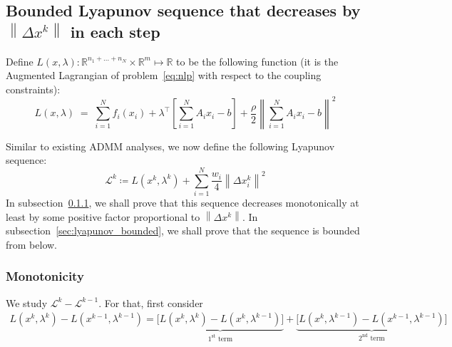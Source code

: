 \documentclass[11pt]{article}
\newcommand{\norm}[1]{\left\lVert #1 \right\rVert}
\begin{document}
\subsection{Bounded Lyapunov sequence that decreases by $\norm{\Delta x^k}$ in each step}\label{sec:proof:lyapunov}
Define $L(x, \lambda) : \mathbb{R}^{n_1 + \ldots + n_N} \times \mathbb{R}^m \mapsto \mathbb{R}$ to be the following function (it is the Augmented Lagrangian of problem~\eqref{eq:nlp} with respect to the coupling constraints):
\begin{equation}\label{eq:L_def}
L(x, \lambda)
\; = \;
\sum_{i = 1}^N f_i(x_i) + \lambda^\top \left[ \sum_{i = 1}^N A_ix_i - b\right] + \frac{\rho}{2} \norm{\sum_{i=1}^N A_ix_i - b}^2
\end{equation}

{\color{magenta} Similar to existing ADMM analyses}, we now define the following Lyapunov sequence:
\begin{equation}\label{eq:lyapunov_sequence_definition}
\mathcal{L}^k \coloneqq L(x^k, \lambda^k) + \sum_{i=1}^N \frac{w_i}{4} \norm{\Delta x_i^k}^2 
\end{equation}
In subsection~\ref{sec:lyapunov_monotone}, we shall prove that this sequence decreases monotonically at least by some positive factor proportional to $\norm{\Delta x^k}$.
In subsection~\ref{sec:lyapunov_bounded}, we shall prove that the sequence is bounded from below.

\subsubsection{Monotonicity}\label{sec:lyapunov_monotone}
We study $\mathcal{L}^k - \mathcal{L}^{k-1}$. For that, first consider
\begin{align*}
L(x^k, \lambda^k) - L(x^{k-1}, \lambda^{k-1})
=
\underset{1^\text{st} \text{ term}}{\underbrace{\big[L(x^k, \lambda^k) - L(x^k, \lambda^{k-1})\big]}}
+
\underset{2^\text{nd} \text{ term}}{\underbrace{\big[L(x^k, \lambda^{k-1}) - L(x^{k-1}, \lambda^{k-1})\big]}}
\end{align*}
\end{document}
